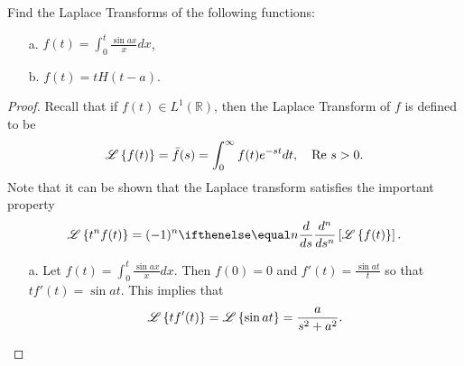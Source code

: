 \begin{problem}{2}
  Find the Laplace Transforms of the following functions:
  \begin{enumerate}
    \item[a.] $\displaystyle f(t) = \int_0^t \frac{\sin ax}{x} dx$,
    \item[b.] $f(t) = t H(t-a)$.
  \end{enumerate}
\end{problem}

\begin{proof}
  Recall that if $f(t) \in L^1(\mathbb{R})$, then the Laplace Transform of $f$ is
  defined to be
  \begin{align}\label{laplacedef}
    \mathscr{L}\left\{ {f(t)} \right\} = \bar{f}(s) = \int_0^\infty f(t) e^{-st} dt, \quad \text{Re } s > 0.
  \end{align}
  Note that it can be shown that the Laplace transform satisfies the important
  property
  \begin{align}\label{laplace1}
    \laplace{t^n f(t)} = (-1)^n \der{s}{n}\left[\laplace{f(t)}\right].
  \end{align}
  \begin{enumerate}
    \item[a.] Let $\displaystyle f(t) = \int_0^t \frac{\sin ax}{x} dx$. Then $f(0) = 0$
      and $\displaystyle f'(t) = \frac{\sin at}{t}$ so that $tf'(t) = \sin at$.
      This implies that
      \begin{align*}
        \mathscr{L}\left\{ {tf'(t)} \right\} = \mathscr{L}\left\{ {\sin at} \right\} = \frac{a}{s^2+a^2}.
      \end{align*}


\end{enumerate}
\end{proof}
